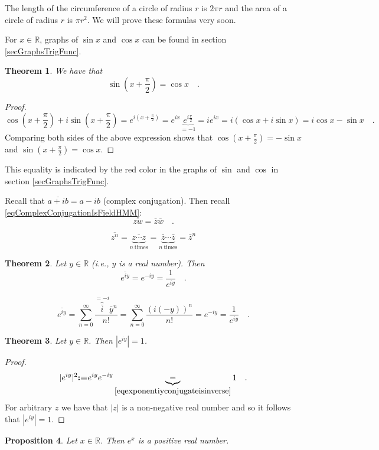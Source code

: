 \documentclass[12pt]{book}
\newcommand{\eqdef}{\textbf{:=}}
\newtheorem{theorem}{Theorem}[section]
\newtheorem{prop}[theorem]{Proposition}
\begin{document}
The length of the circumference of a circle of radius $r$ is $2\pi r$ and the area of a circle of radius $r$ is $\pi r^2$. We will prove these formulas very soon.

For $x\in \mathbb R$, graphs of $\sin x$ and $\cos x$ can be found in section \ref{secGraphsTrigFunc}.
\begin{theorem} We have that
\[
\sin \left(x+\frac{\pi}{2}\right)= \cos x \quad .
\]
\end{theorem}

\begin{proof}
\[
\cos\left(x+\frac{\pi}{2}\right)+ i\sin \left(x+\frac{\pi}2\right)=e^{i(x+\frac{\pi}{2})}= e^{ix} \underbrace{e^{ i\frac{\pi}2 }}_{=-1}= ie^{ix}= i(\cos x + i \sin x)= i\cos x- \sin x\quad .
\]
Comparing both sides of the above expression shows that $\cos(x+\frac{\pi}{2})=-\sin x$ and $\sin(x+\frac{\pi}{2})= \cos x$.
\end{proof}
This equality is indicated by the red color in the graphs of $\sin$ and $\cos$ in section \ref{secGraphsTrigFunc}.

Recall that $\overline{a+ib}=a-ib$  (complex conjugation). Then recall \eqref{eqComplexConjugationIsFieldHMM}:
\[
\overline {z w}= \bar z \bar w\quad .
\]

\[
\overline {z^n}= \overline {\underbrace{z\cdots z}_{n\mathrm{~times}}} = \underbrace{\bar z\cdots  \bar z}_{n\mathrm{~times}}= \bar {z}^n
\]

\begin{theorem}
Let $y\in \mathbb R$ (i.e., $y$ is a real number). Then
\begin{equation}\label{eqexponentiyconjugateisinverse}
\overline {e^{iy}}=e^{-iy}= \frac{1}{e^{iy}}\quad .
\end{equation}
\end{theorem}
\[
\overline {e^{iy}}= \sum_{n=0}^\infty \frac{\overbrace{\bar i}^{=-i} \bar y^n }{ n! }= \sum_{n=0}^\infty \frac{(i(-y))^n}{n!}=  e^{-iy}= \frac{1}{e^{iy}}\quad .
\]
\begin{theorem}
Let $y\in \mathbb R$. Then $|e^{iy}|=1$.
\end{theorem}
\begin{proof}
\[
|e^{iy}|^2 \eqdef e^{iy}e^{-iy}\underbrace{ =}_{ \eqref{eqexponentiyconjugateisinverse}} 1 \quad .
\]
For arbitrary $z$ we have that $|z|$ is a non-negative real number and so it follows that $|e^{iy}|=1$.
\end{proof}

\begin{prop}
Let $x\in \mathbb R$. Then $e^x$ is a positive real number.
\end{prop}
\end{document}
